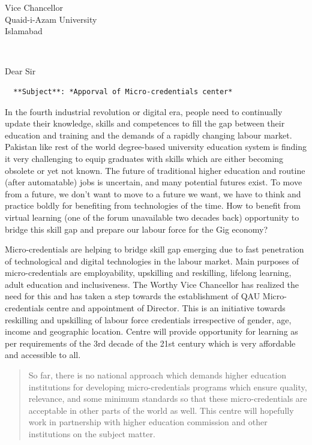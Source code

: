 \documentclass[11pt,a4paper,]{letter}
\date{\Date~\Month~\Year}
\makeatletter
\renewcommand*{\opening}[1]{\thispagestyle{monash}%
   {\@date\par}%
  \vspace{2\parskip}%
  {\raggedright \toname \\ \toaddress \par}%
  \vspace{2\parskip}%
  #1\par\nobreak}}
\makeatother
\begin{document}
\ifdefined\Shaded\renewenvironment{Shaded}{\begin{tcolorbox}[sharp corners, interior hidden, breakable, frame hidden, boxrule=0pt, borderline west={3pt}{0pt}{shadecolor}, enhanced]}{\end{tcolorbox}}\fi
\begin{letter}{Vice Chancellor\\Quaid-i-Azam University\\Islamabad}
\vspace*{1cm}\enlargethispage*{-2cm}
\opening{Dear Sir}
\begin{verbatim}
  **Subject**: *Apporval of Micro-credentials center*
\end{verbatim}

In the fourth industrial revolution or digital era, people need to
continually update their knowledge, skills and competences to fill the
gap between their education and training and the demands of a rapidly
changing labour market. Pakistan like rest of the world degree-based
university education system is finding it very challenging to equip
graduates with skills which are either becoming obsolete or yet not
known. The future of traditional higher education and routine (after
automatable) jobs is uncertain, and many potential futures exist. To
move from a future, we don't want to move to a future we want, we have
to think and practice boldly for benefiting from technologies of the
time. How to benefit from virtual learning (one of the forum unavailable
two decades back) opportunity to bridge this skill gap and prepare our
labour force for the Gig economy?

Micro-credentials are helping to bridge skill gap emerging due to fast
penetration of technological and digital technologies in the labour
market. Main purposes of micro-credentials are employability, upskilling
and reskilling, lifelong learning, adult education and inclusiveness.
The Worthy Vice Chancellor has realized the need for this and has taken
a step towards the establishment of QAU Micro-credentials centre and
appointment of Director. This is an initiative towards reskilling and
upskilling of labour force credentials irrespective of gender, age,
income and geographic location. Centre will provide opportunity for
learning as per requirements of the 3rd decade of the 21st century which
is very affordable and accessible to all.

\begin{quote}
So far, there is no national approach which demands higher education
institutions for developing micro-credentials programs which ensure
quality, relevance, and some minimum standards so that these
micro-credentials are acceptable in other parts of the world as well.
This centre will hopefully work in partnership with higher education
commission and other institutions on the subject matter.
\end{quote}


\end{letter}
\end{document}
